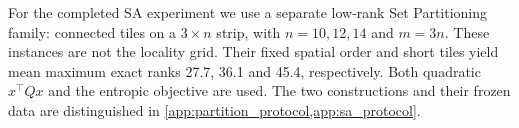 For the completed SA experiment we use a separate low-rank Set Partitioning
family: connected tiles on a $3\times n$ strip, with $n=10,12,14$ and
$m=3n$. These instances are not the locality grid. Their fixed spatial order
and short tiles yield mean maximum exact ranks 27.7, 36.1 and 45.4,
respectively. Both quadratic $x^\top Qx$ and the entropic objective are used.
The two constructions and their frozen data are distinguished in
\cref{app:partition_protocol,app:sa_protocol}.

